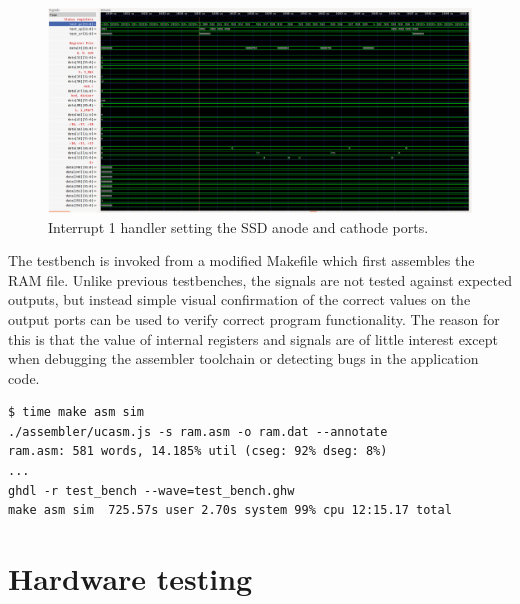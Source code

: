\documentclass[12pt,a4paper]{article}
\begin{document}
\begin{figure}[H]
  \centering
  \includegraphics[width=7.2in]{assets/t5.png}
  \caption{Interrupt 1 handler setting the SSD anode and cathode
    ports.}
\end{figure}

The testbench is invoked from a modified Makefile which first
assembles the RAM file. Unlike previous testbenches, the signals are
not tested against expected outputs, but instead simple visual
confirmation of the correct values on the output ports can be used to
verify correct program functionality. The reason for this is that the
value of internal registers and signals are of little interest except
when debugging the assembler toolchain or detecting bugs in the
application code.

\begin{verbatim}
$ time make asm sim
./assembler/ucasm.js -s ram.asm -o ram.dat --annotate
ram.asm: 581 words, 14.185% util (cseg: 92% dseg: 8%)
...
ghdl -r test_bench --wave=test_bench.ghw
make asm sim  725.57s user 2.70s system 99% cpu 12:15.17 total
\end{verbatim}

\section{Hardware testing}
\end{document}
